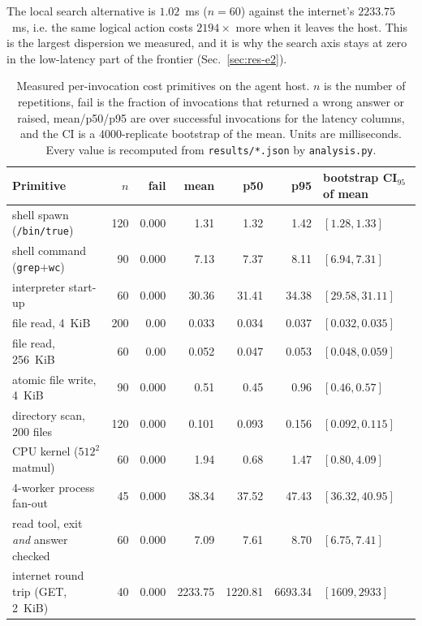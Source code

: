 \documentclass[10pt]{article} %
\begin{document}
The local search alternative is $1.02$~ms ($n{=}60$) against the internet's
$2233.75$~ms, i.e. the same logical action costs $2194\times$ more when it leaves
the host. This is the largest dispersion we measured, and it is why the search
axis stays at zero in the low-latency part of the frontier
(Sec.~\ref{sec:res-e2}).

\begin{table}[t]
\caption{Measured per-invocation cost primitives on the agent host. $n$ is the
number of repetitions, fail is the fraction of invocations that returned a wrong
answer or raised, mean/p50/p95 are over successful invocations for the latency
columns, and the CI is a $4000$-replicate bootstrap of the mean. Units are
milliseconds. Every value is recomputed from \texttt{results/*.json} by
\texttt{analysis.py}.}
\label{tab:latency}
\begin{center}
\small
\begin{tabular}{lrrrrrl}
\toprule
Primitive & $n$ & fail & mean & p50 & p95 & bootstrap CI$_{95}$ of mean \\
\midrule
shell spawn (\texttt{/bin/true})        & 120 & 0.000 & 1.31   & 1.32   & 1.42   & $[1.28, 1.33]$ \\
shell command (\texttt{grep}$+$\texttt{wc}) & 90 & 0.000 & 7.13 & 7.37 & 8.11 & $[6.94, 7.31]$ \\
interpreter start-up                    & 60 & 0.000 & 30.36  & 31.41  & 34.38  & $[29.58, 31.11]$ \\
file read, 4~KiB                        & 200 & 0.00 & 0.033  & 0.034  & 0.037  & $[0.032, 0.035]$ \\
file read, 256~KiB                      & 60 & 0.00 & 0.052  & 0.047  & 0.053  & $[0.048, 0.059]$ \\
atomic file write, 4~KiB                & 90 & 0.000 & 0.51   & 0.45   & 0.96   & $[0.46, 0.57]$ \\
directory scan, 200 files               & 120 & 0.000 & 0.101 & 0.093  & 0.156  & $[0.092, 0.115]$ \\
CPU kernel ($512^2$ matmul)             & 60 & 0.000 & 1.94   & 0.68   & 1.47   & $[0.80, 4.09]$ \\
4-worker process fan-out                & 45 & 0.000 & 38.34  & 37.52  & 47.43  & $[36.32, 40.95]$ \\
read tool, exit \emph{and} answer checked & 60 & 0.000 & 7.09  & 7.61   & 8.70   & $[6.75, 7.41]$ \\
internet round trip (GET, 2~KiB)        & 40 & 0.000 & 2233.75 & 1220.81 & 6693.34 & $[1609, 2933]$ \\

\end{tabular}
\end{center}
\end{table}
\end{document}
